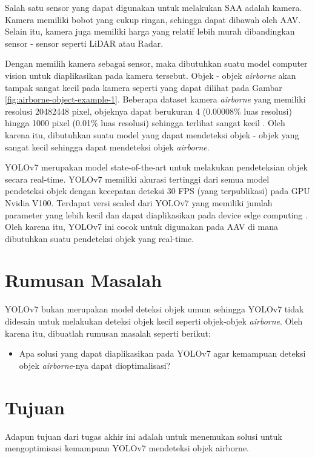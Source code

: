     Salah satu sensor yang dapat digunakan untuk melakukan SAA adalah kamera.
    Kamera memiliki bobot yang cukup ringan, sehingga dapat dibawah oleh AAV.
    Selain itu, kamera juga memiliki harga yang relatif lebih murah dibandingkan sensor - sensor seperti LiDAR atau Radar.

    Dengan memilih kamera sebagai sensor, maka dibutuhkan suatu model computer vision untuk diaplikasikan pada kamera tersebut.
    Objek - objek \emph{airborne} akan tampak sangat kecil pada kamera seperti yang dapat dilihat pada Gambar \ref{fig:airborne-object-example-1}.
    Beberapa dataset kamera \emph{airborne} yang memiliki resolusi 20482448 pixel, objeknya dapat berukuran 4 (0.00008\% luas resolusi) hingga 1000 pixel (0.01\% luas resolusi) sehingga terlihat sangat kecil \parencite{aot_dataset}.
    Oleh karena itu, dibutuhkan suatu model yang dapat mendeteksi objek - objek yang sangat kecil sehingga dapat mendeteksi objek \emph{airborne}.


    YOLOv7 merupakan model state-of-the-art untuk melakukan pendeteksian objek secara real-time.
    YOLOv7 memiliki akurasi tertinggi dari semua model pendeteksi objek dengan kecepatan deteksi 30 FPS (yang terpublikasi) pada GPU Nvidia V100.
    Terdapat versi scaled dari YOLOv7 yang memiliki jumlah parameter yang lebih kecil dan dapat diaplikasikan pada device edge computing \parencite{yolov7}.
    Oleh karena itu, YOLOv7 ini cocok untuk digunakan pada AAV di mana dibutuhkan suatu pendeteksi objek yang real-time.

\section{Rumusan Masalah}
    YOLOv7 bukan merupakan model deteksi objek umum sehingga YOLOv7 tidak didesain untuk melakukan deteksi objek kecil seperti objek-objek \emph{airborne}.
    Oleh karena itu, dibuatlah rumusan masalah seperti berikut:
    \begin{itemize}
        \item Apa solusi yang dapat diaplikasikan pada YOLOv7 agar kemampuan deteksi objek \emph{airborne}-nya dapat dioptimalisasi?
    \end{itemize}

\section{Tujuan}
    Adapun tujuan dari tugas akhir ini adalah untuk menemukan solusi untuk mengoptimisasi kemampuan YOLOv7 mendeteksi objek airborne.

